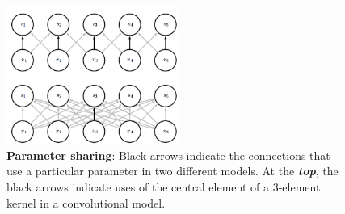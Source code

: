 \documentclass{report}
\begin{document}
\begin{figure}[h!]
  \centering
  \includegraphics[width=0.5\textwidth]{Convolutional_Networks/parameter_sharing.png}
  \caption{\textbf{Parameter sharing}: Black arrows indicate the connections that use a particular parameter in two different models. At the \textbf{\textit{top}}, the black arrows indicate uses of the central element of a 3-element kernel in a convolutional model.}
\end{figure}

%
%

\end{document}
